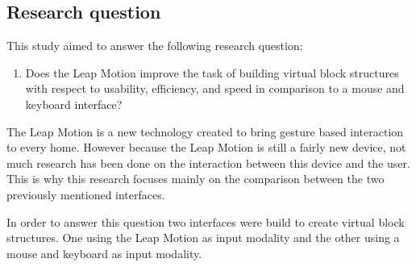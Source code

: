 \subsection{Research question}
This study aimed to answer the following research question:
\begin{enumerate}
\item Does the Leap Motion improve the task of building virtual block structures with respect to usability, efficiency, and speed in comparison to a mouse and keyboard interface?
\end{enumerate}
The Leap Motion is a new technology created to bring gesture based interaction to every home. 
However because the Leap Motion is still a fairly new device, not much research has been done on the interaction between this device and the user.
This is why this research focuses mainly on the comparison between the two previously mentioned interfaces.  

In order to answer this question two interfaces were build to create virtual block structures. 
One using the Leap Motion as input modality and the other using a mouse and keyboard as input modality. 